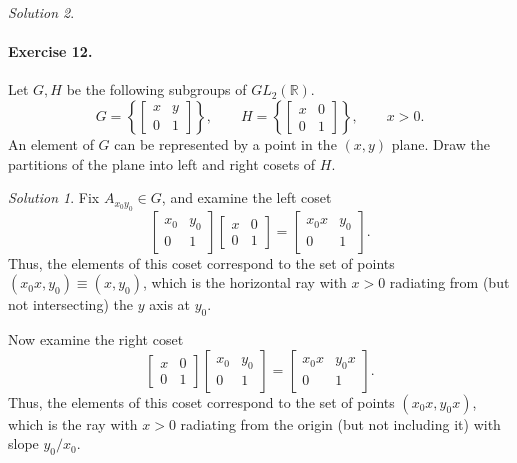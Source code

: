 \documentclass[11pt]{report}
\def\R{\mathbb{R}}
\theoremstyle{remark}
\newtheorem*{solution}{Solution}
\begin{document}
\begin{solution}
    \paragraph{Exercise 12.} Let $G, H$ be the following subgroups of $GL_2(\R)$. \[
        G = \left\{ \begin{bmatrix}
            x & y \\ 0 & 1
        \end{bmatrix} \right\}, \qquad
        H = \left\{ \begin{bmatrix}
            x & 0 \\ 0 & 1
        \end{bmatrix} \right\}, \qquad x > 0.
    \] An element of $G$ can be represented by a point in the $(x, y)$ plane. Draw
    the partitions of the plane into left and right cosets of $H$.
    \begin{solution}
        Fix $A_{x_0y_0} \in G$, and examine the left coset \[
            \begin{bmatrix}
                x_0 & y_0 \\ 0 & 1
            \end{bmatrix} \begin{bmatrix}
                x & 0 \\ 0 & 1
            \end{bmatrix} = \begin{bmatrix}
                x_0x & y_0 \\ 0 & 1
            \end{bmatrix}.
        \] Thus, the elements of this coset correspond to the set of points $(x_0x,
        y_0) \equiv (x, y_0)$, which is the horizontal ray with $x > 0$ radiating
        from (but not intersecting) the $y$ axis at $y_0$.

        Now examine the right coset \[
            \begin{bmatrix}
                x & 0 \\ 0 & 1
            \end{bmatrix} \begin{bmatrix}
                x_0 & y_0 \\ 0 & 1
            \end{bmatrix} = \begin{bmatrix}
                x_0x & y_0x \\ 0 & 1
            \end{bmatrix}.
        \] Thus, the elements of this coset correspond to the set of points $(x_0x,
        y_0x)$, which is the ray with $x > 0$ radiating from the origin (but not
        including it) with slope $y_0 / x_0$.
    \end{solution}
    



\end{solution}
\end{document}
